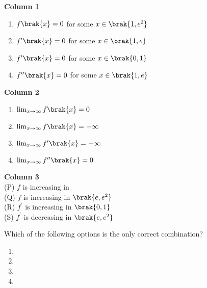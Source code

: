 \noindent
\begin{minipage}[t]{0.32\textwidth}
 \textbf{Column 1}\\
 \begin{enumerate}[label=(\Roman*)] 
     \item $f\brak{x}=0$ for some $x \in \brak{1,e^{2}}$
     \item $f^{\prime}\brak{x}=0$ for some $x \in \brak{1,e}$
     \item $f^{\prime}\brak{x}=0$ for some $x \in \brak{0,1}$
     \item $f^{\prime\prime}\brak{x}=0$ for some $x \in \brak{1,e}$
 \end{enumerate}
\end{minipage}
\hfill
\begin{minipage}[t]{0.28\textwidth}
    \textbf{Column 2}\\
\begin{enumerate}[label=(\roman*)] 
\item $\lim_{x \to \infty} f\brak{x} = 0 $
\item $ \lim_{x \to \infty} f\brak{x} = -\infty $
\item $\lim_{x \to \infty} f^{\prime}\brak{x} = -\infty $
\item $\lim_{x \to \infty} f^{\prime\prime}\brak{x} = 0 $
\end{enumerate}
\end{minipage}
\hfill
\begin{minipage}[t]{0.3\textwidth}
    \textbf{Column 3}\\
    
 (P) $f$ is increasing in  \\
 (Q) $f$ is increasing in $\brak{e,e^{2}}$ \\
 (R) $f^{\prime}$ is increasing in $\brak{0,1} $ \\
 (S) $f^{\prime}$ is decreasing in $\brak{e,e^{2}} $ \\
 
\end{minipage}

\item Which of the following options is the only correct combination?
\begin{enumerate}
    \item {}
    \item {}
    \item {}
    \item {}
\end{enumerate}
    

